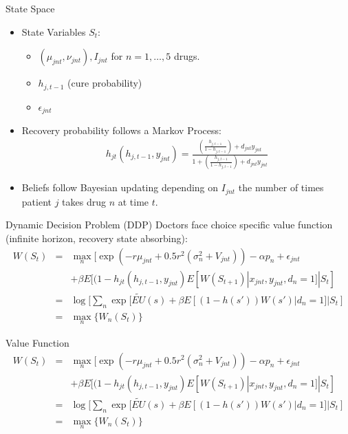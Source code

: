 \documentclass[xcolor=pdftex,dvipsnames,table,mathserif,aspectratio=169]{beamer}
\begin{document}
\begin{frame}{State Space}
\begin{itemize}
\item State Variables $S_t$:
\begin{itemize}
\item $(\mu_{jnt},\nu_{jnt}), I_{jnt}$ for $n=1,\ldots,5$ drugs.
\item $h_{j,t-1}$ (cure probability)
\item $\epsilon_{jnt}$
\end{itemize}
\item Recovery probability follows a Markov Process:
\begin{eqnarray*}
h_{jt}(h_{j,t-1},y_{jnt}) = \frac{ \left(\frac{h_{j,t-1}}{1-h_{j,t-1}} \right) + d_{jnt} y_{jnt}}  {1+ \left(\frac{h_{j,t-1}}{1-h_{j,t-1}} \right) + d_{jnt} y_{jnt}}  
\end{eqnarray*}
\item Beliefs follow Bayesian updating depending on $I_{jnt}$ the number of times patient $j$ takes drug $n$ at time $t$.
\end{itemize}
\end{frame}

\begin{frame}{Dynamic Decision Problem (DDP)}
Doctors face choice specific value function (infinite horizon, recovery state absorbing):
\begin{eqnarray*}
W(S_t) &=& \max_n [\exp(-r\mu_{jnt} + 0.5r^2(\sigma_n^2 + V_{jnt})) - \alpha p_n + \epsilon_{jnt}\\
&&+ \beta E[(1-h_{jt}(h_{j,t-1},y_{jnt}) E[W(S_{t+1}) | x_{jnt},y_{jnt},d_n=1] | S_t]\\
&=& \log [ \sum_n \exp[ \tilde{EU}(s) + \beta E[(1-h(s'))W(s') | d_n=1] | S_t] \\
&=& \max_n \{W_n(S_t)\}
\end{eqnarray*}
\end{frame}

\begin{frame}{Value Function}
\begin{eqnarray*}
W(S_t) &=& \max_n [\exp(-r\mu_{jnt} + 0.5r^2(\sigma_n^2 + V_{jnt})) - \alpha p_n + \epsilon_{jnt}\\
&&+ \beta E[(1-h_{jt}(h_{j,t-1},y_{jnt}) E[W(S_{t+1}) | x_{jnt},y_{jnt},d_n=1] | S_t]\\
&=& \log [ \sum_n \exp[ \tilde{EU}(s) + \beta E[(1-h(s'))W(s') | d_n=1] | S_t] \\
&=& \max_n \{W_n(S_t)\}
\end{eqnarray*}
\end{frame}
\end{document}
